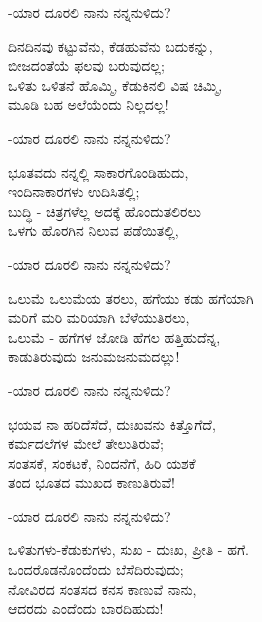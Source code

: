 \begin{flushright}
-ಯಾರ ದೂರಲಿ ನಾನು ನನ್ನನುಳಿದು?
\end{flushright}

\begin{myquote}
ದಿನದಿನವು ಕಟ್ಟುವೆನು, ಕೆಡಹುವೆನು ಬದುಕನ್ನು,\\ಬೀಜದಂತೆಯೆ ಫಲವು ಬರುವುದಲ್ಲ;\\ಒಳಿತು ಒಳಿತನೆ ಹೊಮ್ಮಿ, ಕೆಡುಕಿನಲಿ ವಿಷ ಚಿಮ್ಮಿ,\\ಮೂಡಿ ಬಹ ಅಲೆಯೆಂದು ನಿಲ್ಲದಲ್ಲ!
\end{myquote}

\begin{flushright}
-ಯಾರ ದೂರಲಿ ನಾನು ನನ್ನನುಳಿದು?
\end{flushright}

\begin{myquote}
ಭೂತವದು ನನ್ನಲ್ಲಿ ಸಾಕಾರಗೊಂಡಿಹುದು,\\ಇಂದಿನಾಕಾರಗಳು ಉದಿಸಿತಲ್ಲಿ;\\ಬುದ್ಧಿ - ಚಿತ್ರಗಳೆಲ್ಲ ಅದಕ್ಕೆ ಹೊಂದುತಲಿರಲು\\ಒಳಗು ಹೊರಗಿನ ನಿಲುವ ಪಡೆಯಿತಲ್ಲಿ,
\end{myquote}

\begin{flushright}
-ಯಾರ ದೂರಲಿ ನಾನು ನನ್ನನುಳಿದು?
\end{flushright}

\begin{myquote}
ಒಲುಮೆ ಒಲುಮೆಯ ತರಲು, ಹಗೆಯು ಕಡು ಹಗೆಯಾಗಿ\\ಮರಿಗೆ ಮರಿ ಮರಿಯಾಗಿ ಬೆಳೆಯುತಿರಲು,\\ಒಲುಮೆ - ಹಗೆಗಳ ಜೋಡಿ ಹೆಗಲ ಹತ್ತಿಹುದೆನ್ನ,\\ಕಾಡುತಿರುವುದು ಜನುಮಜನುಮದಲ್ಲು!
\end{myquote}

\begin{flushright}
-ಯಾರ ದೂರಲಿ ನಾನು ನನ್ನನುಳಿದು?
\end{flushright}

\begin{myquote}
ಭಯವ ನಾ ಹರಿದೆಸೆದೆ, ದುಃಖವನು ಕಿತ್ತೊಗೆದೆ,\\ಕರ್ಮದಲೆಗಳ ಮೇಲೆ ತೇಲುತಿರುವೆ;\\ಸಂತಸಕೆ, ಸಂಕಟಕೆ, ನಿಂದನೆಗೆ, ಹಿರಿ ಯಶಕೆ\\ತಂದ ಭೂತದ ಮುಖದ ಕಾಣುತಿರುವೆ!
\end{myquote}

\begin{flushright}
-ಯಾರ ದೂರಲಿ ನಾನು ನನ್ನನುಳಿದು?
\end{flushright}

\begin{myquote}
ಒಳಿತುಗಳು-ಕೆಡುಕುಗಳು, ಸುಖ - ದುಃಖ, ಪ್ರೀತಿ - ಹಗೆ.\\ಒಂದರೊಡನೊಂದೆಂದು ಬೆಸೆದಿರುವುದು;\\ನೋವಿರದ ಸಂತಸದ ಕನಸ ಕಾಣುವೆ ನಾನು,\\ಆದರದು ಎಂದೆಂದು ಬಾರದಿಹುದು!
\end{myquote}

